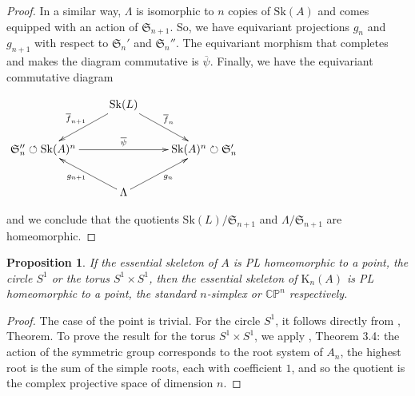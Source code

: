 \documentclass{amsart}%
\numberwithin{equation}{subsection}
\theoremstyle{plain2}
\newtheorem{prop}[equation]{Proposition}
\theoremstyle{definition2}
\theoremstyle{stepstyle}
\theoremstyle{point}
\theoremstyle{subpoint}
\newcommand{\CP}{\ensuremath{\mathbb{CP}}}
\newcommand{\Sk}{\mathrm{Sk}}
\begin{document}
\begin{proof}
In a similar way, $\Lambda$ is isomorphic to $n$ copies of $\Sk(A)$ and comes equipped with an action of $\mathfrak{S}_{n+1}$. So, we have equivariant projections $g_n$ and $g_{n+1}$ with respect to $\mathfrak{S}_n'$ and $\mathfrak{S}_n''$. The equivariant morphism that completes and makes the diagram commutative is $\overline{\psi}$. Finally, we have the equivariant commutative diagram
\begin{center}
\xymatrixrowsep{1pc}
\xymatrixrowsep{1pc}
$\xymatrix{
& \Sk(L)  \ar[ld]_{\overline{f}_{n+1}} \ar[rd]^{\overline{f}_{n}}  &\\
\mathfrak{S}_n'' \circlearrowleft\Sk(A)^n  \ar[rr]^{\overline{\psi}}& & \Sk(A)^n\circlearrowright \mathfrak{S}_n' \\
& \Lambda\ar[lu]^{g_{n+1}}\ar[ru]_{g_n} &
}$
\end{center} and we conclude that the quotients $\Sk(L)/\mathfrak{S}_{n+1}$ and $\Lambda/\mathfrak{S}_{n+1}$ are homeomorphic.
\end{proof}

\begin{prop} \label{prop top essential skeleton Kummer}
If the essential skeleton of $A$ is PL homeomorphic to a point, the circle $S^1$ or the torus $S^1 \times S^1$, then the essential skeleton of $\text{K}_n(A)$ is PL homeomorphic to a point, the standard $n$-simplex or $\CP^n$ respectively. 
\end{prop}
\begin{proof}
The case of the point is trivial. For the circle $S^1$, it follows directly from \cite{Morton}, Theorem. To prove the result for the torus $S^1 \times S^1$, we apply \cite{Looijenga}, Theorem 3.4: the action of the symmetric group corresponds to the root system of $A_n$, the highest root is the sum of the simple roots, each with coefficient $1$, and so the quotient is the complex projective space of dimension $n$.
\end{proof}
\end{document}
